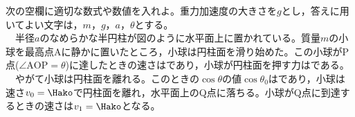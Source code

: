 \hakosyokika
\item
    \begin{mawarikomi}{150pt}{}
        次の空欄に適切な数式や数値を入れよ。重力加速度の大きさを$g$とし，答えに用いてよい文字は，$m$，$g$，$a$，$\theta $とする。\\
        ~~半径$a$のなめらかな半円柱が図のように水平面上に置かれている。質量$m$の小球を最高点Aに静かに置いたところ，小球は円柱面を滑り始めた。この小球がP点($\angle \mathrm{AOP}=\theta $)に達したときの速さは\Hako であり，小球が円柱面を押す力は\Hako である。\\
        ~~やがて小球は円柱面を離れる。このときの$\cos{\theta }$の値$\cos{\theta _0}$は\Hako であり，小球は速さ$v_0=\Hako $で円柱面を離れ，水平面上のQ点に落ちる。小球がQ点に到達するときの速さは$v_1=\Hako $となる。
    \end{mawarikomi}